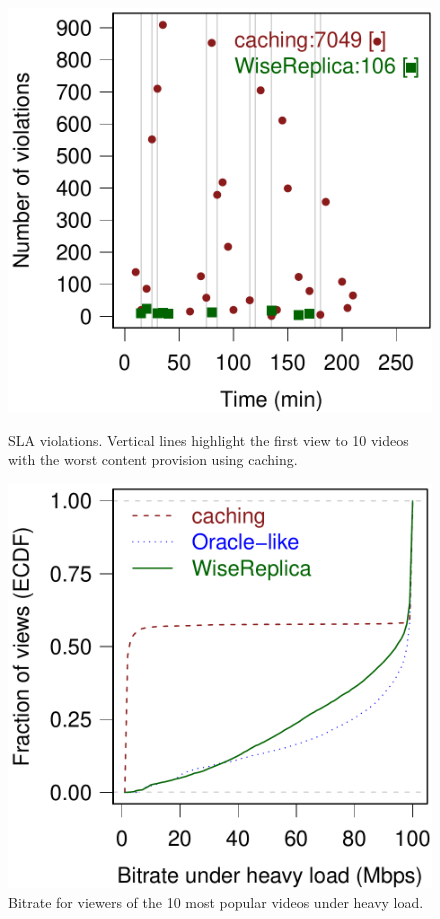 \begin{figure}[htbp]
  \begin{minipage}[t]{0.48\linewidth}
     \includegraphics[width=.9\textwidth]{inputs/img/violations}
  \caption{SLA violations. Vertical lines highlight the first view to 10 videos with the worst content provision using caching.}
  \label{fig:violations}
  \end{minipage}
  \hspace{0.1cm}
  \begin{minipage}[t]{0.48\linewidth}
     \includegraphics[width=.9\textwidth]{inputs/img/ecdf_agg_bwd_under_heavy_load}
  \caption{Bitrate for viewers of the 10 most popular videos under heavy load.}
  \label{fig:avg_bitrate}
  \end{minipage}
\end{figure}
